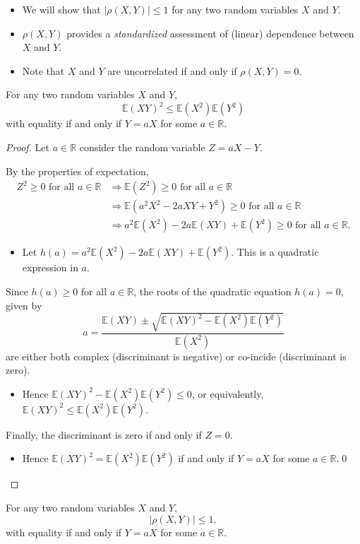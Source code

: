 \documentclass[lecture]{csm}
\newcommand{\R}{\mathbb{R}}
\newcommand{\expe}{\mathbb{E}}
\def\it{\item}
\def\bit{\begin{itemize}}
\def\eit{\end{itemize}}
\begin{document}
\begin{remark}
\bit
\it We will show that $|\rho(X,Y)|\leq 1$ for any two random variables $X$ and $Y$.
\it $\rho(X,Y)$ provides a \emph{standardized} assessment of (linear) dependence between $X$ and $Y$.
\it Note that $X$ and $Y$ are uncorrelated if and only if $\rho(X,Y)=0$. 
\eit
\end{remark}
%
\begin{theorem}\label{thm:cauchyschwarz}
For any two random variables $X$ and $Y$, 
\[
\expe(XY)^2\leq\expe(X^2)\expe(Y^2)
\]
with equality if and only if $Y=aX$ for some $a\in\R$.

\end{theorem}

\break %

\begin{proof}
Let $a\in\R$ consider the random variable $Z=aX-Y$. 
\par
By the properties of expectation,
\begin{align*}
Z^2\geq 0 \text{ for all } a\in\R
	& \Rightarrow \expe(Z^2)\geq 0 \text{ for all } a\in\R \\
	& \Rightarrow \expe(a^2X^2 - 2aXY + Y^2) \geq 0 \text{ for all } a\in\R \\
	& \Rightarrow a^2\expe(X^2) - 2a\expe(XY) + \expe(Y^2) \geq 0 \text{ for all } a\in\R.
\end{align*}

\bit
\it Let $h(a)=a^2\expe(X^2) - 2a\expe(XY) + \expe(Y^2)$. This is a quadratic expression in $a$.
\eit
Since $h(a)\geq 0$ for all $a\in\R$, the roots of the quadratic equation $h(a)=0$, given by
\[
a = \frac{\expe(XY)\pm\sqrt{\expe(XY)^2-\expe(X^2)\expe(Y^2)}}{\expe(X^2)}
\]
are either both complex (discriminant is negative) or co-incide (discriminant is zero). 
\bit
\it Hence $\expe(XY)^2-\expe(X^2)\expe(Y^2) \leq 0$, or equivalently, $\expe(XY)^2\leq \expe(X^2)\expe(Y^2)$.
\eit
Finally, the discriminant is zero if and only if $Z=0$.
\bit
\it Hence $\expe(XY)^2=\expe(X^2)\expe(Y^2)$ if and only if $Y=aX$ for some $a\in\R$.\qed
\eit
\end{proof}

\newpage
\begin{theorem}\label{thm:correlation}
For any two random variables $X$ and $Y$, 
\[
|\rho(X,Y)|\leq 1,
\]
with equality if and only if $Y=aX$ for some $a\in\R$.
\end{theorem}
\end{document}
